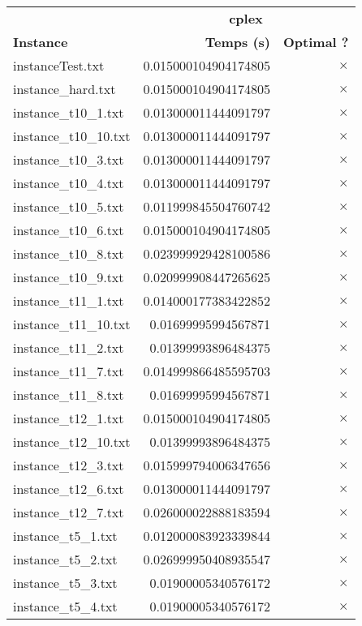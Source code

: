 \documentclass{article}
\begin{document}
\begin{center}
\renewcommand{\arraystretch}{1.4}
\begin{tabular}{|l|rr|}
\hline
 & \multicolumn{2}{c|}{\textbf{cplex}}\\
\textbf{Instance} & \textbf{Temps (s)} & \textbf{Optimal ?} \\\hline
instanceTest.txt & 0.015000104904174805 & $\times$ \\
instance\_hard.txt & 0.015000104904174805 & $\times$ \\
instance\_t10\_1.txt & 0.013000011444091797 & $\times$ \\
instance\_t10\_10.txt & 0.013000011444091797 & $\times$ \\
instance\_t10\_3.txt & 0.013000011444091797 & $\times$ \\
instance\_t10\_4.txt & 0.013000011444091797 & $\times$ \\
instance\_t10\_5.txt & 0.011999845504760742 & $\times$ \\
instance\_t10\_6.txt & 0.015000104904174805 & $\times$ \\
instance\_t10\_8.txt & 0.023999929428100586 & $\times$ \\
instance\_t10\_9.txt & 0.020999908447265625 & $\times$ \\
instance\_t11\_1.txt & 0.014000177383422852 & $\times$ \\
instance\_t11\_10.txt & 0.01699995994567871 & $\times$ \\
instance\_t11\_2.txt & 0.01399993896484375 & $\times$ \\
instance\_t11\_7.txt & 0.014999866485595703 & $\times$ \\
instance\_t11\_8.txt & 0.01699995994567871 & $\times$ \\
instance\_t12\_1.txt & 0.015000104904174805 & $\times$ \\
instance\_t12\_10.txt & 0.01399993896484375 & $\times$ \\
instance\_t12\_3.txt & 0.015999794006347656 & $\times$ \\
instance\_t12\_6.txt & 0.013000011444091797 & $\times$ \\
instance\_t12\_7.txt & 0.026000022888183594 & $\times$ \\
instance\_t5\_1.txt & 0.012000083923339844 & $\times$ \\
instance\_t5\_2.txt & 0.026999950408935547 & $\times$ \\
instance\_t5\_3.txt & 0.01900005340576172 & $\times$ \\
instance\_t5\_4.txt & 0.01900005340576172 & $\times$ \\

\end{tabular}
\end{center}
\end{document}
